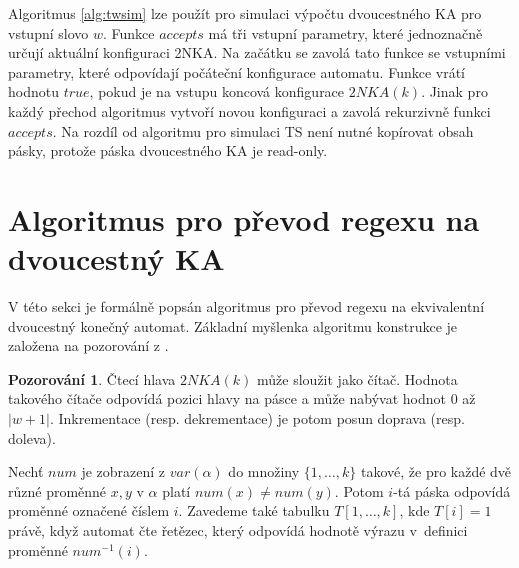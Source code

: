 \documentclass[thesis=B,czech]{FITthesis}[2019/12/23]
\theoremstyle{definition}
\newtheorem{pozorovani}{Pozorování}[chapter]
\begin{document}
Algoritmus \ref{alg:twsim} lze použít pro simulaci výpočtu dvoucestného KA pro vstupní slovo $w$. Funkce $accepts$ má tři vstupní parametry, které jednoznačně určují aktuální konfiguraci 2NKA. Na začátku se zavolá tato funkce se vstupními parametry, které odpovídají počáteční konfigurace automatu. Funkce vrátí hodnotu $true$, pokud je na vstupu koncová konfigurace $2NKA(k)$. Jinak pro každý přechod algoritmus vytvoří novou konfiguraci a zavolá rekurzivně funkci $accepts$. Na rozdíl od algoritmu pro simulaci TS není nutné kopírovat obsah pásky, protože páska dvoucestného KA je read-only.

\fi

\iffalse
\section{Algoritmus pro převod regexu na dvoucestný KA}

V této sekci je formálně popsán algoritmus pro převod regexu na ekvivalentní dvoucestný konečný automat. Základní myšlenka algoritmu konstrukce je založena na pozorování z \cite[s. 21--22]{schmidthesis}.
\begin{pozorovani} Čtecí hlava $2NKA(k)$ může sloužit jako čítač. Hodnota takového čítače odpovídá pozici hlavy na pásce a může nabývat hodnot $0$ až $|w+1|$. Inkrementace (resp. dekrementace) je potom posun doprava (resp. doleva). 
\end{pozorovani}

Nechť $num$ je zobrazení z $var(\alpha)$ do množiny $\{1, \dots, k\}$ takové, že pro každé dvě různé proměnné $x, y$ v $\alpha$ platí $num(x) \ne num(y)$. Potom $i$-tá páska odpovídá proměnné označené číslem $i$. Zavedeme také tabulku $T[1, \dots, k]$, kde $T[i] = 1$ právě, když automat čte řetězec, který odpovídá hodnotě výrazu v~definici proměnné $num^{-1}(i)$. 
\end{document}

